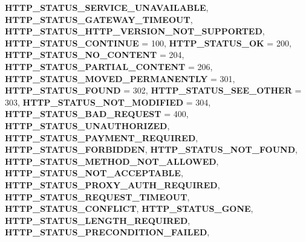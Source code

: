 \begin{DoxyCompactItemize}
{\bfseries H\+T\+T\+P\+\_\+\+S\+T\+A\+T\+U\+S\+\_\+\+S\+E\+R\+V\+I\+C\+E\+\_\+\+U\+N\+A\+V\+A\+I\+L\+A\+B\+LE}, 
{\bfseries H\+T\+T\+P\+\_\+\+S\+T\+A\+T\+U\+S\+\_\+\+G\+A\+T\+E\+W\+A\+Y\+\_\+\+T\+I\+M\+E\+O\+UT}, 
{\bfseries H\+T\+T\+P\+\_\+\+S\+T\+A\+T\+U\+S\+\_\+\+H\+T\+T\+P\+\_\+\+V\+E\+R\+S\+I\+O\+N\+\_\+\+N\+O\+T\+\_\+\+S\+U\+P\+P\+O\+R\+T\+ED}, 
\newline
{\bfseries H\+T\+T\+P\+\_\+\+S\+T\+A\+T\+U\+S\+\_\+\+C\+O\+N\+T\+I\+N\+UE} = 100, 
{\bfseries H\+T\+T\+P\+\_\+\+S\+T\+A\+T\+U\+S\+\_\+\+OK} = 200, 
{\bfseries H\+T\+T\+P\+\_\+\+S\+T\+A\+T\+U\+S\+\_\+\+N\+O\+\_\+\+C\+O\+N\+T\+E\+NT} = 204, 
{\bfseries H\+T\+T\+P\+\_\+\+S\+T\+A\+T\+U\+S\+\_\+\+P\+A\+R\+T\+I\+A\+L\+\_\+\+C\+O\+N\+T\+E\+NT} = 206, 
\newline
{\bfseries H\+T\+T\+P\+\_\+\+S\+T\+A\+T\+U\+S\+\_\+\+M\+O\+V\+E\+D\+\_\+\+P\+E\+R\+M\+A\+N\+E\+N\+T\+LY} = 301, 
{\bfseries H\+T\+T\+P\+\_\+\+S\+T\+A\+T\+U\+S\+\_\+\+F\+O\+U\+ND} = 302, 
{\bfseries H\+T\+T\+P\+\_\+\+S\+T\+A\+T\+U\+S\+\_\+\+S\+E\+E\+\_\+\+O\+T\+H\+ER} = 303, 
{\bfseries H\+T\+T\+P\+\_\+\+S\+T\+A\+T\+U\+S\+\_\+\+N\+O\+T\+\_\+\+M\+O\+D\+I\+F\+I\+ED} = 304, 
\newline
{\bfseries H\+T\+T\+P\+\_\+\+S\+T\+A\+T\+U\+S\+\_\+\+B\+A\+D\+\_\+\+R\+E\+Q\+U\+E\+ST} = 400, 
{\bfseries H\+T\+T\+P\+\_\+\+S\+T\+A\+T\+U\+S\+\_\+\+U\+N\+A\+U\+T\+H\+O\+R\+I\+Z\+ED}, 
{\bfseries H\+T\+T\+P\+\_\+\+S\+T\+A\+T\+U\+S\+\_\+\+P\+A\+Y\+M\+E\+N\+T\+\_\+\+R\+E\+Q\+U\+I\+R\+ED}, 
{\bfseries H\+T\+T\+P\+\_\+\+S\+T\+A\+T\+U\+S\+\_\+\+F\+O\+R\+B\+I\+D\+D\+EN}, 
\newline
{\bfseries H\+T\+T\+P\+\_\+\+S\+T\+A\+T\+U\+S\+\_\+\+N\+O\+T\+\_\+\+F\+O\+U\+ND}, 
{\bfseries H\+T\+T\+P\+\_\+\+S\+T\+A\+T\+U\+S\+\_\+\+M\+E\+T\+H\+O\+D\+\_\+\+N\+O\+T\+\_\+\+A\+L\+L\+O\+W\+ED}, 
{\bfseries H\+T\+T\+P\+\_\+\+S\+T\+A\+T\+U\+S\+\_\+\+N\+O\+T\+\_\+\+A\+C\+C\+E\+P\+T\+A\+B\+LE}, 
{\bfseries H\+T\+T\+P\+\_\+\+S\+T\+A\+T\+U\+S\+\_\+\+P\+R\+O\+X\+Y\+\_\+\+A\+U\+T\+H\+\_\+\+R\+E\+Q\+U\+I\+R\+ED}, 
\newline
{\bfseries H\+T\+T\+P\+\_\+\+S\+T\+A\+T\+U\+S\+\_\+\+R\+E\+Q\+U\+E\+S\+T\+\_\+\+T\+I\+M\+E\+O\+UT}, 
{\bfseries H\+T\+T\+P\+\_\+\+S\+T\+A\+T\+U\+S\+\_\+\+C\+O\+N\+F\+L\+I\+CT}, 
{\bfseries H\+T\+T\+P\+\_\+\+S\+T\+A\+T\+U\+S\+\_\+\+G\+O\+NE}, 
{\bfseries H\+T\+T\+P\+\_\+\+S\+T\+A\+T\+U\+S\+\_\+\+L\+E\+N\+G\+T\+H\+\_\+\+R\+E\+Q\+U\+I\+R\+ED}, 
\newline
{\bfseries H\+T\+T\+P\+\_\+\+S\+T\+A\+T\+U\+S\+\_\+\+P\+R\+E\+C\+O\+N\+D\+I\+T\+I\+O\+N\+\_\+\+F\+A\+I\+L\+ED}, 

\end{DoxyCompactItemize}
